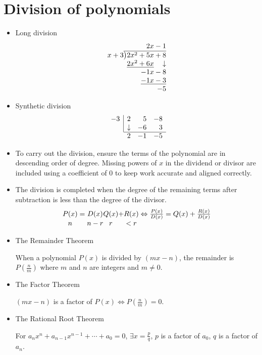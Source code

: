 \section{Division of polynomials}
\begin{itemize}
    \item Long division
        \[
            \begin{array}{r}
                \phantom{2x^2+}2x-1 \\
                x+3\overline{\smash{\big)}2x^2+5x+8} \\
                \underline{2x^2+6x}\phantom{{}+\,}\downarrow \\
                -1x-8 \\
                \underline{-1x-3} \\
                -5
            \end{array}
        \]
    \item Synthetic division
        \[
            \begin{array}{rrrr}
                \multicolumn{1}{r|}{-3} & 2 & 5 & -8 \\
                \multicolumn{1}{r|}{} & \downarrow & -6 & 3 \\ \cline{2-4}
                & 2 & -1 & -5
            \end{array}
        \]
    \item To carry out the division, ensure the terms of the polynomial are in descending order of degree. Missing powers of $x$ in the dividend or divisor are included using a coefficient of 0 to keep work accurate and aligned correctly.
    \item The division is completed when the degree of the remaining terms after subtraction is less than the degree of the divisor.
        \[
            \begin{array}{c@{}c@{}c@{}c@{}c@{}c@{}c}
            P(x) & {}={} & D(x) & Q(x) & + & R(x) & {}\Leftrightarrow \frac{P(x)}{D(x)}=Q(x)+\frac{R(x)}{D(x)} \\
            n & & n-r & r & & <r &
            \end{array}
        \]
    \item The Remainder Theorem

        When a polynomial $P(x)$ is divided by $(mx-n)$, the remainder is $P(\frac{n}{m})$ where $m$ and $n$ are integers and $m\neq 0$.
    \item The Factor Theorem
        
        $(mx-n)$ is a factor of $P(x)\iff P(\frac{n}{m})=0$.
    \item The Rational Root Theorem

        For $a_nx^n+a_{n-1}x^{n-1}+\cdots+a_0=0$, $\exists x=\frac{p}{q}$, $p$ is a factor of $a_0$, $q$ is a factor of $a_n$.
\end{itemize}
